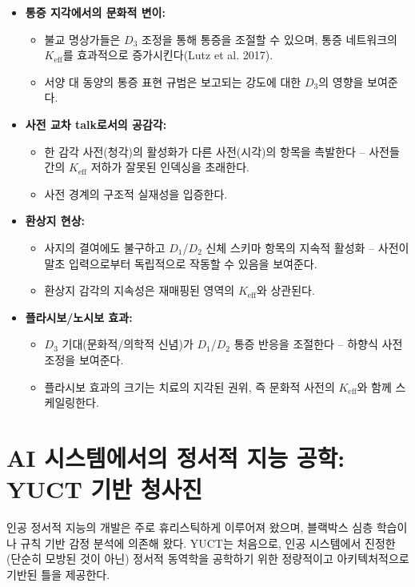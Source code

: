 \documentclass[12pt,a4paper]{article}
\newcommand{\eff}{\mathrm{eff}}
\newcommand{\Ke}{K_{\eff}}
\begin{document}
	\begin{itemize}
		\item \textbf{통증 지각에서의 문화적 변이:}
		\begin{itemize}
			\item 불교 명상가들은 \(D_3\) 조정을 통해 통증을 조절할 수 있으며, 통증 네트워크의 \(\Ke\)를 효과적으로 증가시킨다(Lutz et al. 2017).
			\item 서양 대 동양의 통증 표현 규범은 보고되는 강도에 대한 \(D_3\)의 영향을 보여준다.
		\end{itemize}
		
		\item \textbf{사전 교차 talk로서의 공감각:}
		\begin{itemize}
			\item 한 감각 사전(청각)의 활성화가 다른 사전(시각)의 항목을 촉발한다 – 사전들 간의 \(\Ke\) 저하가 잘못된 인덱싱을 초래한다.
			\item 사전 경계의 구조적 실재성을 입증한다.
		\end{itemize}
		
		\item \textbf{환상지 현상:}
		\begin{itemize}
			\item 사지의 결여에도 불구하고 \(D_1\)/\(D_2\) 신체 스키마 항목의 지속적 활성화 – 사전이 말초 입력으로부터 독립적으로 작동할 수 있음을 보여준다.
			\item 환상지 감각의 지속성은 재매핑된 영역의 \(\Ke\)와 상관된다.
		\end{itemize}
		
		\item \textbf{플라시보/노시보 효과:}
		\begin{itemize}
			\item \(D_3\) 기대(문화적/의학적 신념)가 \(D_1\)/\(D_2\) 통증 반응을 조절한다 – 하향식 사전 조정을 보여준다.
			\item 플라시보 효과의 크기는 치료의 지각된 권위, 즉 문화적 사전의 \(\Ke\)와 함께 스케일링한다.
		\end{itemize}
	\end{itemize}
	
	\section{AI 시스템에서의 정서적 지능 공학: YUCT 기반 청사진}
	
	인공 정서적 지능의 개발은 주로 휴리스틱하게 이루어져 왔으며, 블랙박스 심층 학습이나 규칙 기반 감정 분석에 의존해 왔다. YUCT는 처음으로, 인공 시스템에서 진정한(단순히 모방된 것이 아닌) 정서적 동역학을 공학하기 위한 정량적이고 아키텍처적으로 기반된 틀을 제공한다.
	
\end{document}

